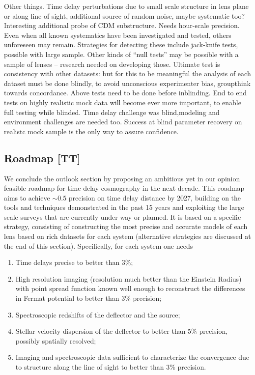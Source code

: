 Other things. Time delay perturbations due to small scale structure in
lens plane or along line of sight, additional source of random noise,
maybe systematic too? Interesting additional probe of CDM substructure.
Needs hour-scale precision. Even when all known systematics have been
investigated and tested, others unforeseen may remain. Strategies for
detecting these include jack-knife tests, possible with large sample.
Other kinds
of ``null tests'' may be possible with a sample of lenses -- research needed
on developing those.
Ultimate test is consistency with other datasets: but for this to be
meaningful the analysis of each dataset must be done blindly, to avoid
unconscious experimenter bias, groupthink towards concordance.  Above
tests need to be done before inblinding.
End to end tests on highly realistic mock data will become ever more
important, to enable full testing while blinded. Time delay challenge
was blind,modeling and environment challenges are needed too. Success
at blind parameter recovery on realistc mock sample is the only way
to assure confidence.



\subsection{Roadmap [TT]}
\label{ssec:roadmap}

We conclude the outlook section by proposing an ambitious yet in our
opinion feasible roadmap for time delay cosmography in the next
decade. This roadmap aims to achieve $\sim0.5$ precision on time delay
distance by 2027, building on the tools and techniques demonstrated in
the past 15 years and exploiting the large scale surveys that are
currently under way or planned. It is based on a specific strategy,
consisting of constructing the most precise and accurate models of
each lens based on rich datasets for each system (alternative
strategies are discussed at the end of this section). Specifically,
for each system one needs

\begin{enumerate}
\item Time delays precise to better than $3\%$;
\item High resolution imaging (resolution much better than the Einstein Radius) with point spread function known well enough to reconstruct the differences in Fermat potential to better than $3\%$ precision;
\item Spectroscopic redshifts of the deflector and the source;
\item Stellar velocity dispersion of the deflector to better than 5\% precision, possibly spatially resolved;
\item Imaging and spectroscopic data sufficient to characterize the convergence due to structure along the line of sight to better than $3\%$ precision.
\end{enumerate}

